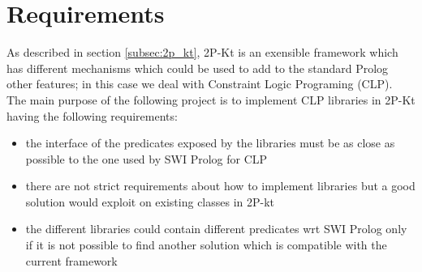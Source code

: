\section{Requirements}\label{sec:Requirements}

As described in section \ref{subsec:2p_kt}, 2P-Kt is an exensible framework which has different mechanisms
which could be used to add to the standard Prolog other features; in this case we deal with Constraint Logic Programing (CLP).\newline
The main purpose of the following project is to implement CLP libraries in 2P-Kt having the following requirements:
\begin{itemize}
    \item the interface of the predicates exposed by the libraries must be as close as possible to the one used by SWI Prolog for CLP
    \item there are not strict requirements about how to implement libraries but a good solution would exploit on existing classes in 2P-kt
    \item the different libraries could contain different predicates wrt SWI Prolog only if it is not possible to find another solution which is compatible with the current framework
\end{itemize}

